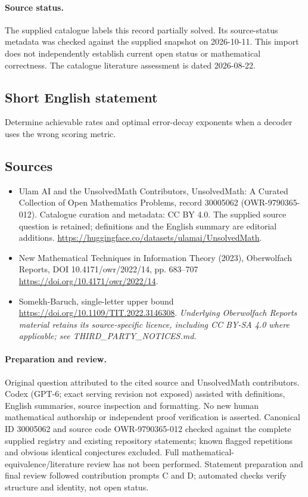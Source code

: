 \documentclass[11pt]{article}
\begin{document}
\paragraph{Source status.}
The supplied catalogue labels this record partially solved. Its source-status metadata was checked against the supplied snapshot on 2026-10-11. This import does not independently establish current open status or mathematical correctness. The catalogue literature assessment is dated 2026-08-22.
\subsection{Short English statement}
Determine achievable rates and optimal error-decay exponents when a decoder uses the wrong scoring metric.
\subsection{Sources}
\begin{itemize}
\item[S1] Ulam AI and the UnsolvedMath Contributors, UnsolvedMath: A Curated Collection of Open Mathematics Problems, record 30005062 (OWR-9790365-012). Catalogue curation and metadata: CC BY 4.0. The supplied source question is retained; definitions and the English summary are editorial additions.
\url{https://huggingface.co/datasets/ulamai/UnsolvedMath}.
\item[S2] New Mathematical Techniques in Information Theory (2023), Oberwolfach Reports, DOI 10.4171/owr/2022/14, pp. 683--707
\url{https://doi.org/10.4171/owr/2022/14}.
\item[S3] Somekh-Baruch, single-letter upper bound
\url{https://doi.org/10.1109/TIT.2022.3146308}.
\textit{Underlying Oberwolfach Reports material retains its source-specific licence, including CC BY-SA 4.0 where applicable; see THIRD\_PARTY\_NOTICES.md.}
\end{itemize}
\paragraph{Preparation and review.}
Original question attributed to the cited source and UnsolvedMath contributors. Codex (GPT-6; exact serving revision not exposed) assisted with definitions, English summaries, source inspection and formatting. No new human mathematical authorship or independent proof verification is asserted. Canonical ID 30005062 and source code OWR-9790365-012 checked against the complete supplied registry and existing repository statements; known flagged repetitions and obvious identical conjectures excluded. Full mathematical-equivalence/literature review has not been performed. Statement preparation and final review followed contribution prompts C and D; automated checks verify structure and identity, not open status.
\label{end:30005062}
\end{document}
